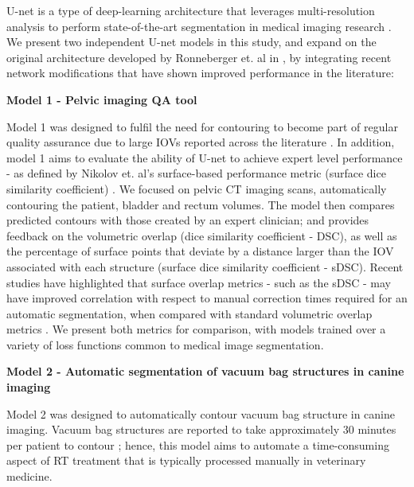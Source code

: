 U-net is a type of deep-learning architecture that leverages multi-resolution analysis to perform state-of-the-art segmentation in medical imaging research \cite{Kazemifar_2018, Zhu_2018}. We present two independent U-net models in this study, and expand on the original architecture developed by Ronneberger et. al in \cite{Ronneberger_2015}, by integrating recent network modifications that have shown improved performance in the literature: 

\textbf{Model 1 - Pelvic imaging QA tool}

Model 1 was designed to fulfil the need for contouring to become part of regular quality assurance due to large IOVs reported across the literature \cite{Vinod_2016}. In addition, model 1 aims to evaluate the ability of U-net to achieve expert level performance - as defined by Nikolov et. al's surface-based performance metric (surface dice similarity coefficient) \cite{Nikolov_2018}. We focused on pelvic CT imaging scans, automatically contouring the patient, bladder and rectum volumes. The model then compares predicted contours with those created by an expert clinician; and provides feedback on the volumetric overlap (dice similarity coefficient - DSC), as well as the percentage of surface points that deviate by a distance larger than the IOV associated with each structure (surface dice similarity coefficient - sDSC). Recent studies have highlighted that surface overlap metrics - such as the sDSC - may have improved correlation with respect to manual correction times required for an automatic segmentation, when compared with standard volumetric overlap metrics \cite{Vaassen_2020}. We present both metrics for comparison, with models trained over a variety of loss functions common to medical image segmentation.

\textbf{Model 2 - Automatic segmentation of vacuum bag structures in canine imaging}

Model 2 was designed to automatically contour vacuum bag structure in canine imaging. Vacuum bag structures are reported to take approximately 30 minutes per patient to contour \cite{CITATION}; hence, this model aims to automate a time-consuming aspect of RT treatment that is typically processed manually in veterinary medicine.


